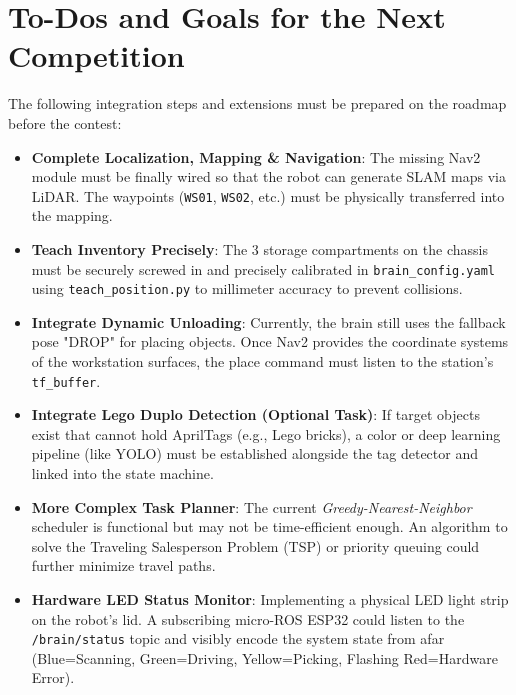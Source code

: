\documentclass[12pt,a4paper]{article}
\begin{document}
\section{To-Dos and Goals for the Next Competition}
The following integration steps and extensions must be prepared on the roadmap before the contest:
\begin{itemize}
    \item \textbf{Complete Localization, Mapping \& Navigation}: The missing Nav2 module must be finally wired so that the robot can generate SLAM maps via LiDAR. The waypoints (\texttt{WS01}, \texttt{WS02}, etc.) must be physically transferred into the mapping.
    \item \textbf{Teach Inventory Precisely}: The 3 storage compartments on the chassis must be securely screwed in and precisely calibrated in \texttt{brain\_config.yaml} using \texttt{teach\_position.py} to millimeter accuracy to prevent collisions.
    \item \textbf{Integrate Dynamic Unloading}: Currently, the brain still uses the fallback pose "DROP" for placing objects. Once Nav2 provides the coordinate systems of the workstation surfaces, the place command must listen to the station's \texttt{tf\_buffer}.
    \item \textbf{Integrate Lego Duplo Detection (Optional Task)}: If target objects exist that cannot hold AprilTags (e.g., Lego bricks), a color or deep learning pipeline (like YOLO) must be established alongside the tag detector and linked into the state machine.
    \item \textbf{More Complex Task Planner}: The current \textit{Greedy-Nearest-Neighbor} scheduler is functional but may not be time-efficient enough. An algorithm to solve the Traveling Salesperson Problem (TSP) or priority queuing could further minimize travel paths.
    \item \textbf{Hardware LED Status Monitor}: Implementing a physical LED light strip on the robot's lid. A subscribing micro-ROS ESP32 could listen to the \texttt{/brain/status} topic and visibly encode the system state from afar (Blue=Scanning, Green=Driving, Yellow=Picking, Flashing Red=Hardware Error).
\end{itemize}
\end{document}
